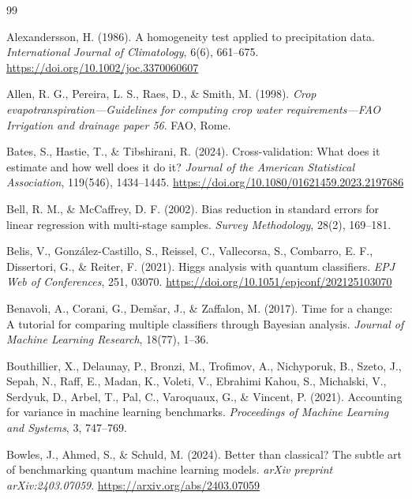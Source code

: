 \documentclass[11pt,a4paper]{article}
\begin{document}
\newpage
\begin{thebibliography}{99}

Alexandersson, H. (1986). A homogeneity test applied to precipitation data. \textit{International Journal of Climatology}, 6(6), 661--675. \url{https://doi.org/10.1002/joc.3370060607}

Allen, R. G., Pereira, L. S., Raes, D., \& Smith, M. (1998). \textit{Crop evapotranspiration---Guidelines for computing crop water requirements---FAO Irrigation and drainage paper 56}. FAO, Rome.

Bates, S., Hastie, T., \& Tibshirani, R. (2024). Cross-validation: What does it estimate and how well does it do it? \textit{Journal of the American Statistical Association}, 119(546), 1434--1445. \url{https://doi.org/10.1080/01621459.2023.2197686}

Bell, R. M., \& McCaffrey, D. F. (2002). Bias reduction in standard errors for linear regression with multi-stage samples. \textit{Survey Methodology}, 28(2), 169--181.

Belis, V., Gonz\'alez-Castillo, S., Reissel, C., Vallecorsa, S., Combarro, E. F., Dissertori, G., \& Reiter, F. (2021). Higgs analysis with quantum classifiers. \textit{EPJ Web of Conferences}, 251, 03070. \url{https://doi.org/10.1051/epjconf/202125103070}

Benavoli, A., Corani, G., Dem\v{s}ar, J., \& Zaffalon, M. (2017). Time for a change: A tutorial for comparing multiple classifiers through Bayesian analysis. \textit{Journal of Machine Learning Research}, 18(77), 1--36.

Bouthillier, X., Delaunay, P., Bronzi, M., Trofimov, A., Nichyporuk, B., Szeto, J., Sepah, N., Raff, E., Madan, K., Voleti, V., Ebrahimi Kahou, S., Michalski, V., Serdyuk, D., Arbel, T., Pal, C., Varoquaux, G., \& Vincent, P. (2021). Accounting for variance in machine learning benchmarks. \textit{Proceedings of Machine Learning and Systems}, 3, 747--769.

Bowles, J., Ahmed, S., \& Schuld, M. (2024). Better than classical? The subtle art of benchmarking quantum machine learning models. \textit{arXiv preprint arXiv:2403.07059}. \url{https://arxiv.org/abs/2403.07059}


\end{thebibliography}
\end{document}
